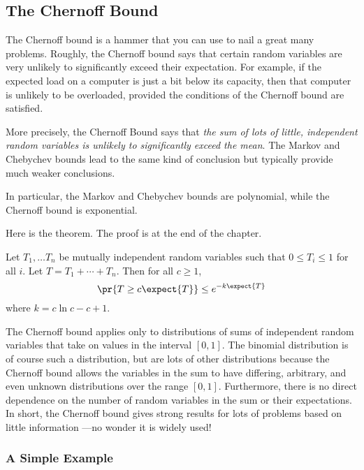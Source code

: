 \subsection{The Chernoff Bound}

The Chernoff bound is a hammer that you can use to nail a great many
problems.  Roughly, the Chernoff bound says that certain random
variables are very unlikely to significantly exceed their expectation.
For example, if the expected load on a computer is just a bit below
its capacity, then that computer is unlikely to be overloaded,
provided the conditions of the Chernoff bound are satisfied.

More precisely, the Chernoff Bound says that \emph{the sum of lots of
  little, independent random variables is unlikely to significantly
  exceed the mean}.  The Markov and Chebychev bounds lead to the same
kind of conclusion but typically provide much weaker conclusions.

\begin{editingnotes}
In particular, the Markov and Chebychev bounds are polynomial, while
the Chernoff bound is exponential.
\end{editingnotes}

Here is the theorem.  The proof is at the end of the chapter.

\begin{theorem}
\label{chernoff}
Let $T_1, \dots T_n$ be mutually independent random variables such
that $0 \leq T_i \leq 1$ for all $i$.  Let $T = T_1 + \cdots + T_n$.
Then for all $c \geq 1$,
\begin{equation}\label{chernoff-leq}
\pr{T \geq c \expect{T}} \leq e^{-k \expect{T}} 
\end{equation}
where $k = c \ln c - c + 1$.
\end{theorem}

The Chernoff bound applies only to distributions of sums of
independent random variables that take on values in the interval $[0,
  1]$.  The binomial distribution is of course such a distribution,
but are lots of other distributions because the Chernoff bound allows
the variables in the sum to have differing, arbitrary, and even unknown
distributions over the range $[0, 1]$.  Furthermore, there is no
direct dependence on the number of random variables in the sum or
their expectations.  In short, the Chernoff bound gives strong results
for lots of problems based on little information ---no wonder it is
widely used!

\subsubsection{A Simple Example}

